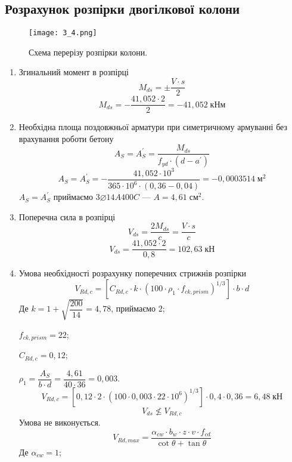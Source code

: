 \documentclass[a4paper,14pt]{article}
\begin{document}
\subsection{Розрахунок розпірки двогілкової колони}
\begin{figure}[h!]
    \begin{center}
        \texttt{[image: 3\_4.png]}
        \caption{Схема перерізу розпірки колони.}\label{ris3_4} 
    \end{center}
\end{figure}
    \begin{enumerate}
        \item Згинальний момент в розпірці
        \begin{equation}
            M_{ds} = \pm \dfrac{V \cdot s}{2} 
        \end{equation}
        $$M_{ds} = - \dfrac{41,052 \cdot 2}{2} = -41,052\;\textit{кНм}$$
        \item Необхідна площа поздовжньої арматури при симетричному армуванні без врахування роботи бетону
        \begin{equation}
            A_S = A_S^\prime = \dfrac{M_{ds}}{f_{yd} \cdot (d - a^\prime)}
        \end{equation} 
        $$A_S = A_S^\prime = - \dfrac{41,052 \cdot 10^3}{365 \cdot 10^6 \cdot (0,36 - 0,04)} = -0,0003514\;\textit{м}^2$$
        $A_S = A_S^\prime$ приймаємо $3\varnothing14A400C$ --- $A = 4,61\;\textit{см}^2$.
        \item Поперечна сила в розпірці
        \begin{equation}
            V_{ds} = \dfrac{2M_{ds}}{c} = \dfrac{V \cdot s}{c}
        \end{equation}
        $$V_{ds} = \dfrac{41,052 \cdot 2}{0,8} = 102,63\;\textit{кН}$$
        \item Умова необхідності розрахунку поперечних стрижнів розпірки
        \begin{equation}
            V_{Rd,c} = \left[C_{Rd,c} \cdot k \cdot \left(100 \cdot \rho_1 \cdot f_{ck,prism}\right)^{1/3}\right] \cdot b \cdot d
        \end{equation}
        Де $k = 1 + \sqrt{\dfrac{200}{14}} = 4,78$, приймаємо $2$;

        $f_{ck,prism} = 22$;

        $C_{Rd,c} = 0,12$;

        $\rho_1 = \dfrac{A_S}{b \cdot d} = \dfrac{4,61}{40 \cdot 36} = 0,003$.
        $$V_{Rd,c} = \left[0,12 \cdot 2 \cdot \left(100 \cdot 0,003 \cdot 22 \cdot 10^6 \right)^{1/3}\right] \cdot 0,4 \cdot 0,36 = 6,48\;\textit{кН}$$
        $$V_{ds} \nleqslant V_{Rd,c}$$
        Умова не виконується.
        \begin{equation}
            V_{Rd,max} = \dfrac{\alpha_{cw} \cdot b_w \cdot z \cdot v \cdot f_{cd}}{\cot\theta + \tan\theta}
        \end{equation}
        Де $\alpha_{cw} = 1$;


\end{enumerate}
\end{document}
